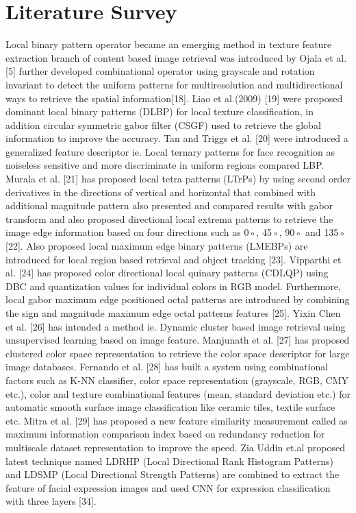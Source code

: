 \section{Literature Survey}
Local binary pattern operator became an emerging method in texture feature extraction branch of content based image retrieval was introduced by Ojala et al. [5] further developed combinational operator using grayscale and rotation invariant to detect the uniform patterns for multiresolution and multidirectional ways to retrieve the spatial information[18]. Liao et al.(2009) [19] were proposed dominant local binary patterns (DLBP) for local texture classification, in addition circular symmetric gabor filter (CSGF) used to retrieve the global information to improve the accuracy. Tan and Triggs et al. [20] were introduced a generalized feature descriptor ie. Local ternary patterns for face recognition as noiseless sensitive and more discriminate in uniform regions compared LBP. Murala et al. [21] has proposed local tetra patterns (LTrPs) by using second order derivatives in the directions of vertical and horizontal that combined with additional magnitude pattern also presented and compared results with gabor transform and also proposed directional local extrema patterns to retrieve the image edge information based on four directions such as 0◦, 45◦, 90◦ and 135◦ [22]. Also proposed local maximum edge binary patterns (LMEBPs) are introduced for local region based retrieval and object tracking [23]. Vipparthi et al. [24] has proposed color directional local quinary patterns (CDLQP) using DBC and quantization values for individual colors in RGB model. Furthermore, local gabor maximum edge positioned octal patterns are introduced by combining the sign and magnitude maximum edge octal patterns features [25]. Yixin Chen et al. [26] has intended a method ie. Dynamic cluster based image retrieval using unsupervised learning based on image feature. Manjunath et al. [27] has proposed clustered color space representation to retrieve the color space descriptor for large image databases. Fernando et al. [28] has built a system using combinational factors such as K-NN classifier, color space representation (grayscale, RGB, CMY etc.), color and texture combinational features (mean, standard deviation etc.) for automatic smooth surface image classification like ceramic tiles, textile surface etc. Mitra et al. [29] has proposed a new feature similarity measurement called as maximum information comparison index based on redundancy reduction for multiscale dataset representation to improve the speed. Zia Uddin et.al proposed latest technique named LDRHP (Local Directional Rank Histogram Patterns) and LDSMP (Local Directional Strength Patterns) are combined to extract the feature of facial expression images and used CNN for expression classification with three layers [34].


